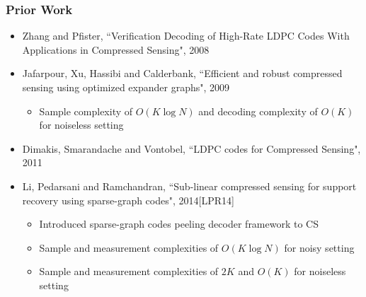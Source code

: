 \begin{frame}\frametitle{Prior Work}
\begin{itemize}
\item Zhang and Pfister, ``Verification Decoding of High-Rate LDPC Codes With Applications in Compressed Sensing", 2008
\item  Jafarpour, Xu, Hassibi and Calderbank, ``Efficient and robust compressed sensing using optimized expander graphs", 2009
\begin{itemize}
\item Sample complexity of $O(K\log N)$ and decoding complexity of $O(K)$ for noiseless setting
\end{itemize}
\item Dimakis, Smarandache and Vontobel, ``LDPC codes for Compressed Sensing", 2011

\vspace{3ex}
\item Li, Pedarsani and Ramchandran, ``Sub-linear compressed sensing for support recovery using sparse-graph codes", 2014[LPR14]
\begin{itemize}
\item Introduced sparse-graph codes peeling decoder framework to CS
\item Sample and measurement complexities of $O(K\log N)$ for noisy setting
\item Sample and measurement complexities of $2K$ and $O(K)$ for noiseless setting
\end{itemize}
\end{itemize}
\end{frame}


